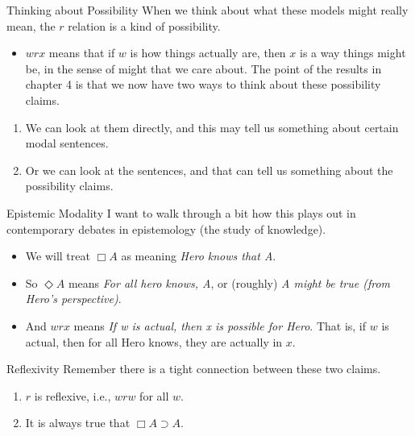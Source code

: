 \documentclass[
  14pt,
  letterpaper,
  ignorenonframetext,
  handout]{beamer}
\providecommand{\tightlist}{%
  \setlength{\itemsep}{0pt}\setlength{\parskip}{0pt}}\usepackage{longtable,booktabs,array}
\begin{document}
\begin{frame}{Thinking about Possibility}
\protect\hypertarget{thinking-about-possibility}{}
When we think about what these models might really mean, the \(r\)
relation is a kind of possibility.

\begin{itemize}
\tightlist
\item
  \(wrx\) means that if \(w\) is how things actually are, then \(x\) is
  a way things might be, in the sense of might that we care about.
  \pause  The point of the results in chapter 4 is that we now have two
  ways to think about these possibility claims.
\end{itemize}

\begin{enumerate}
\tightlist
\item
  We can look at them directly, and this may tell us something about
  certain modal sentences.
\item
  Or we can look at the sentences, and that can tell us something about
  the possibility claims.
\end{enumerate}
\end{frame}

\begin{frame}{Epistemic Modality}
\protect\hypertarget{epistemic-modality}{}
I want to walk through a bit how this plays out in contemporary debates
in epistemology (the study of knowledge).

\begin{itemize}
\tightlist
\item
  We will treat \(\Box A\) as meaning \emph{Hero knows that A}.
\item
  So \(\Diamond A\) means \emph{For all hero knows, A}, or (roughly)
  \emph{A might be true (from Hero's perspective)}.
\item
  And \(wrx\) means \emph{If w is actual, then x is possible for Hero}.
  That is, if \(w\) is actual, then for all Hero knows, they are
  actually in \(x\).
\end{itemize}
\end{frame}

\begin{frame}{Reflexivity}
\protect\hypertarget{reflexivity}{}
Remember there is a tight connection between these two claims.

\begin{enumerate}
\tightlist
\item
  \(r\) is reflexive, i.e., \(wrw\) for all \(w\).
\item
  It is always true that \(\Box A \supset A\).
\end{enumerate}
\end{frame}
\end{document}
